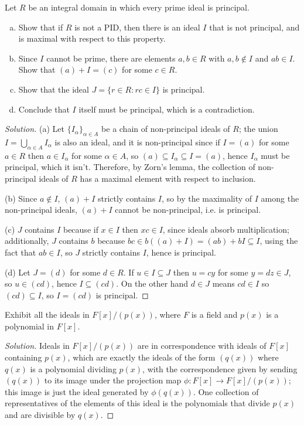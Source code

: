 \documentclass[10pt]{article}
\providecommand{\ii}{\item}
\newenvironment{soln}{\begin{proof}[Solution]}{\end{proof}}
\begin{document}
\begin{problem}
    Let $R$ be an integral domain in which every prime ideal is principal.
    \begin{enumerate}[(a)]
        \ii Show that if $R$ is not a PID,
	then there is an ideal $I$ that is not principal,
	and is maximal with respect to this property.
	\ii Since $I$ cannot be prime, there are elements $a,b\in R$
	with $a,b\notin I$ and $ab\in I$. Show that $(a) + I = (c)$
	for some $c\in R$.
	\ii Show that the ideal $J = \{r\in R : rc\in I\}$ is principal.
	\ii Conclude that $I$ itself must be principal, which is a contradiction.
    \end{enumerate}
\end{problem}

\begin{soln}
    (a) Let $\{I_\alpha\}_{\alpha\in A}$ be a chain of non-principal ideals of $R$;
    the union $I = \bigcup_{\alpha\in A}I_\alpha$ is also an ideal,
    and it is non-principal since if $I = (a)$ for some $a\in R$
    then $a\in I_\alpha$ for some $\alpha\in A$, so
    $(a)\subseteq I_\alpha\subseteq I = (a)$, hence $I_\alpha$ must be principal,
    which it isn't. Therefore, by Zorn's lemma,
    the collection of non-principal ideals of $R$
    has a maximal element with respect to inclusion.

    (b) Since $a\notin I$, $(a) + I$ strictly contains $I$,
    so by the maximality of $I$ among the non-principal ideals,
    $(a) + I$ cannot be non-principal, i.e. is principal.

    (c) $J$ contains $I$ because if $x\in I$ then $xc\in I$,
    since ideals absorb multiplication; additionally, $J$ contains $b$
    because $bc\in b((a) + I) = (ab) + bI\subseteq I$,
    using the fact that $ab\in I$, so $J$ strictly contains $I$,
    hence is principal.

    (d) Let $J = (d)$ for some $d\in R$.
    If $u\in I\subseteq J$ then $u = cy$ for some $y = dz\in J$,
    so $u\in (cd)$, hence $I\subseteq (cd)$.
    On the other hand $d\in J$ means $cd\in I$
    so $(cd)\subseteq I$, so $I = (cd)$ is principal.
\end{soln}

\begin{problem}
    Exhibit all the ideals in $F[x]/(p(x))$, where $F$ is a field
    and $p(x)$ is a polynomial in $F[x]$.
\end{problem}

\begin{soln}
    Ideals in $F[x]/(p(x))$ are in correspondence with ideals of $F[x]$
    containing $p(x)$, which are exactly the ideals of the form
    $(q(x))$ where $q(x)$ is a polynomial dividing $p(x)$,
    with the correspondence given by sending $(q(x))$ to
    its image under the projection map $\phi\colon F[x]\to F[x]/(p(x))$;
    this image is just the ideal generated by $\phi(q(x))$.
    One collection of representatives of the elements of this ideal is
    the polynomials that divide $p(x)$ and are divisible by $q(x)$.
\end{soln}
\end{document}
